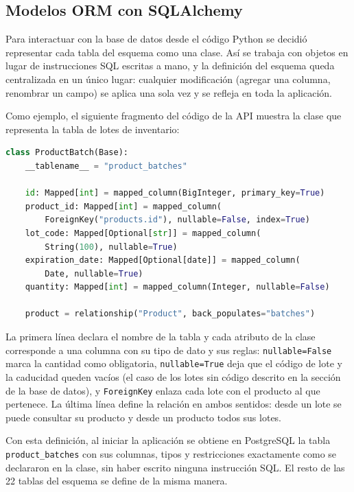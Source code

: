 \subsection{Modelos ORM con SQLAlchemy}

Para interactuar con la base de datos desde el código Python se decidió representar cada tabla del esquema como una clase. Así se trabaja con objetos en lugar de instrucciones SQL escritas a mano, y la definición del esquema queda centralizada en un único lugar: cualquier modificación (agregar una columna, renombrar un campo) se aplica una sola vez y se refleja en toda la aplicación.

Como ejemplo, el siguiente fragmento del código de la API muestra la clase que representa la tabla de lotes de inventario:\newpage

\begin{lstlisting}[language=Python]
class ProductBatch(Base):
    __tablename__ = "product_batches"

    id: Mapped[int] = mapped_column(BigInteger, primary_key=True)
    product_id: Mapped[int] = mapped_column(
        ForeignKey("products.id"), nullable=False, index=True)
    lot_code: Mapped[Optional[str]] = mapped_column(
        String(100), nullable=True)
    expiration_date: Mapped[Optional[date]] = mapped_column(
        Date, nullable=True)
    quantity: Mapped[int] = mapped_column(Integer, nullable=False)

    product = relationship("Product", back_populates="batches")
\end{lstlisting}

La primera línea declara el nombre de la tabla y cada atributo de la clase corresponde a una columna con su tipo de dato y sus reglas: \texttt{nullable=False} marca la cantidad como obligatoria, \texttt{nullable=True} deja que el código de lote y la caducidad queden vacíos (el caso de los lotes sin código descrito en la sección de la base de datos), y \texttt{ForeignKey} enlaza cada lote con el producto al que pertenece. La última línea define la relación en ambos sentidos: desde un lote se puede consultar su producto y desde un producto todos sus lotes.

Con esta definición, al iniciar la aplicación se obtiene en PostgreSQL la tabla \texttt{product\_batches} con sus columnas, tipos y restricciones exactamente como se declararon en la clase, sin haber escrito ninguna instrucción SQL. El resto de las 22 tablas del esquema se define de la misma manera.

\newpage

